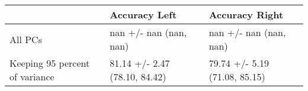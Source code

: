 \begin{tabular}{lll}
\toprule
{} &                  Accuracy Left &                 Accuracy Right \\
\midrule
All PCs                        &         nan +/- nan (nan, nan) &         nan +/- nan (nan, nan) \\
Keeping 95 percent of variance &  81.14 +/- 2.47 (78.10, 84.42) &  79.74 +/- 5.19 (71.08, 85.15) \\
\bottomrule
\end{tabular}

